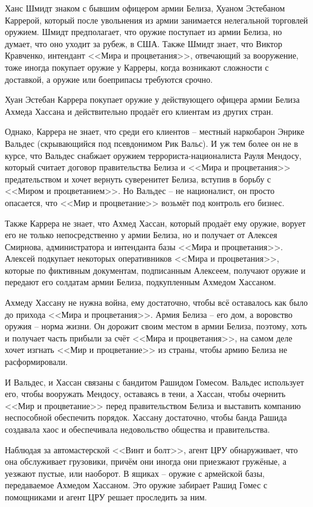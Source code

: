 \documentclass{article}
\begin{document}
Ханс Шмидт знаком с бывшим офицером армии Белиза, Хуаном Эстебаном
Каррерой, который после увольнения из армии занимается нелегальной
торговлей оружием. Шмидт предполагает, что оружие поступает из армии
Белиза, но думает, что оно уходит за рубеж, в США. Также Шмидт знает,
что Виктор Кравченко, интендант <<Мира и процветания>>, отвечающий за
вооружение, тоже иногда покупает оружие у Карреры, когда возникают
сложности с доставкой, а оружие или боеприпасы требуются срочно.

Хуан Эстебан Каррера покупает оружие у действующего офицера армии Белиза
Ахмеда Хассана и действительно продаёт его клиентам из других стран.

Однако, Каррера не знает, что среди его клиентов -- местный наркобарон
Энрике Вальдес (скрывающийся под псевдонимом Рик Вальс). И уж тем более
он не в курсе, что Вальдес снабжает оружием террориста-националиста
Рауля Мендосу, который считает договор правительства Белиза и <<Мира и
процветания>> предательством и хочет вернуть суверенитет Белиза, вступив
в борьбу с <<Миром и процветанием>>. Но Вальдес -- не националист, он
просто опасается, что <<Мир и процветание>> возьмёт под контроль его
бизнес.

Также Каррера не знает, что Ахмед Хассан, который продаёт ему оружие,
ворует его не только непосредственно у армии Белиза, но и получает от
Алексея Смирнова, администратора и интенданта базы <<Мира и процветания>>.
Алексей подкупает некоторых оперативников <<Мира и процветания>>, которые
по фиктивным документам, подписанным Алексеем, получают оружие и
передают его солдатам армии Белиза, подкупленным Ахмедом Хассаном.

Ахмеду Хассану не нужна война, ему достаточно, чтобы всё оставалось как
было до прихода <<Мира и процветания>>. Армия Белиза -- его дом, а
воровство оружия -- норма жизни. Он дорожит своим местом в армии Белиза,
поэтому, хоть и получает часть прибыли за счёт <<Мира и процветания>>, на
самом деле хочет изгнать <<Мир и процветание>> из страны, чтобы армию
Белиза не расформировали.

И Вальдес, и Хассан связаны с бандитом Рашидом Гомесом. Вальдес
использует его, чтобы вооружать Мендосу, оставаясь в тени, а Хассан,
чтобы очернить <<Мир и процветание>> перед правительством Белиза и
выставить компанию неспособной обеспечить порядок. Хассану достаточно,
чтобы банда Рашида создавала хаос и обеспечивала недовольство общества и
правительства.

Наблюдая за автомастерской <<Винт и болт>>, агент ЦРУ обнаруживает, что
она обслуживает грузовики, причём они иногда они приезжают гружёные, а
уезжают пустые, или наоборот. В ящиках -- оружие с армейской базы,
передаваемое Ахмедом Хассаном. Это оружие забирает Рашид Гомес с
помощниками и агент ЦРУ решает проследить за ним.
\end{document}
